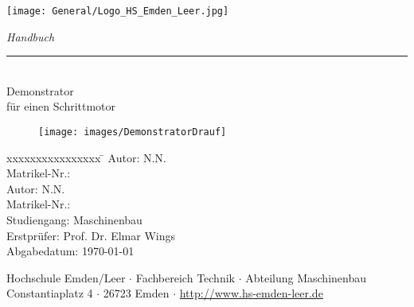 %
%

\begin{titlepage}
    
    \begin{flushleft} 
        \texttt{[image: General/Logo\_HS\_Emden\_Leer.jpg]}
    \end{flushleft} 
    
    \begin{flushright}
        \vspace{2cm}
        \LARGE \textsl{Handbuch}\\
        \rule{0.6\textwidth}{0.4pt} ~\\
        \vspace{0.5cm}
        \textsf{\LARGE Demonstrator}\\
        \textsf{\LARGE für einen Schrittmotor}
    \end{flushright}
    
    \begin{figure}[htb]
    	\begin{center}
    		\texttt{[image: images/DemonstratorDrauf]}
    	\end{center}
    \end{figure} 
    
    \vspace{3cm}
    \large
    \begin{tabbing}
       xxxxxxxxxxxxxxxx \= \kill
       Autor:			\> N.N. \\
       Matrikel-Nr.:	 \\
       Autor:			\> N.N. \\
       Matrikel-Nr.:	 \\


       Studiengang: \> Maschinenbau \\ [0.5cm]
       Erstprüfer: \> Prof. Dr. Elmar Wings \\
        Abgabedatum: \> \today \\
    \end{tabbing}
    
    \vspace{3cm}
    \small
    \begin{center}
        Hochschule Emden/Leer $\cdot$ 
        Fachbereich Technik $\cdot$ 
        Abteilung Maschinenbau \\
        Constantiaplatz 4 $\cdot$ 
        26723 Emden $\cdot$ 
        \url{http://www.hs-emden-leer.de}
    \end{center}
    
\end{titlepage}
